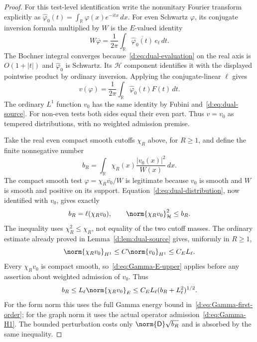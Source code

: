 \documentclass[11pt,a4paper]{article}
\numberwithin{equation}{section}
\theoremstyle{definition}\newtheorem{definition}[theorem]{Definition}
\theoremstyle{remark}\newtheorem{remark}[theorem]{Remark}
\newcommand{\R}{\mathbb R}\newcommand{\C}{\mathbb C}\newcommand{\N}{\mathbb N}
\newcommand{\Hh}{\mathcal H}\newcommand{\Hw}{\mathcal H}
\begin{document}
\begin{proof}
For this test-level identification write the nonunitary Fourier transform explicitly as
$\widehat\varphi_0(t)=\int_\R\varphi(x)e^{-itx}\,dx$.
For even Schwartz $\varphi$, its conjugate inversion formula multiplied by $W$ is the $E$-valued identity
\[
 W\overline\varphi
 =\frac1{2\pi}\int_\R\overline{\widehat\varphi_0(t)}\,e_t\,dt.
\]
The Bochner integral converges because~\eqref{d:eq:dual-evaluation} on the real axis is $O(1+|t|)$ and $\widehat\varphi_0$ is Schwartz. Its $\Hh$ component identifies it with the displayed pointwise product by ordinary inversion. Applying the conjugate-linear $\ell$ gives
\begin{equation}\label{d:eq:dual-test-Fourier}
 v(\varphi)=\frac1{2\pi}\int_\R\widehat\varphi_0(t)F(t)\,dt.
\end{equation}
The ordinary $L^1$ function $v_0$ has the same identity by Fubini and~\eqref{d:eq:dual-source}. For non-even tests both sides equal their even part. Thus $v=v_0$ as tempered distributions, with no weighted admission premise.

Take the real even compact smooth cutoffs $\chi_R$ above, for $R\ge1$, and define the finite nonnegative number
\[
 b_R=\int_\R\chi_R(x)\frac{|v_0(x)|^2}{W(x)}\,dx.
\]
The compact smooth test $\varphi=\chi_R\overline{v_0}/W$ is legitimate because $v_0$ is smooth and $W$ is smooth and positive on its support. Equation~\eqref{d:eq:dual-distribution}, now identified with $v_0$, gives exactly
\begin{equation}\label{d:eq:dual-cutoff-test}
 b_R=\ell(\chi_Rv_0),\qquad
 \norm{\chi_Rv_0}_{\Hh}^2\le b_R.
\end{equation}
The inequality uses $\chi_R^2\le\chi_R$, not equality of the two cutoff masses. The ordinary estimate already proved in Lemma~\ref{d:lem:dual-source} gives, uniformly in $R\ge1$,
\[
 \norm{\chi_Rv_0}_{H^1}\le C\norm{v_0}_{H^1}\le C_E L_\ell.
\]
Every $\chi_Rv_0$ is compact smooth, so~\eqref{d:eq:Gamma-E-upper} applies before any assertion about weighted admission of $v_0$. Thus
\begin{equation}\label{d:eq:dual-quadratic}
 b_R\le L_\ell\norm{\chi_Rv_0}_E
 \le C_E L_\ell(b_R+L_\ell^2)^{1/2}.
\end{equation}
For the form norm this uses the full Gamma energy bound in~\eqref{d:eq:Gamma-first-order}; for the graph norm it uses the actual operator admission~\eqref{d:eq:Gamma-H1}. The bounded perturbation costs only $\norm{\mathsf D}\sqrt{b_R}$ and is absorbed by the same inequality.


\end{proof}
\end{document}
